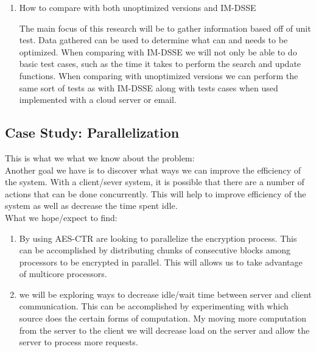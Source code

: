 \begin{enumerate}
\begin{itemize}
    \end{itemize}

  	\item How to compare with both unoptimized versions and IM-DSSE

	The main focus of this research will be to gather information based off of unit test.
    Data gathered can be used to determine what can and needs to be optimized.
    When comparing with IM-DSSE we will not only be able to do basic test cases, such as the time it takes to perform the search and update functions.
    When comparing with unoptimized versions we can perform the same sort of tests as with IM-DSSE along with tests cases when used implemented with a cloud server or email. 
\end{enumerate}



\subsection {Case Study: Parallelization}
\label{subsec:parallel}



This is what we what we know about the problem: \\
Another goal we have is to discover what ways we can improve the efficiency of the system. With a client/sever system, it is possible that there are a number of actions that can be done concurrently. This will help to improve efficiency of the system as well as decrease the time spent idle. \\

What we hope/expect to find:
\begin{enumerate}
\item By using AES-CTR are looking to parallelize the encryption process. This can be accomplished by distributing chunks of consecutive blocks among processors to be encrypted in parallel. This will allows us to take advantage of multi\-core processors.
\item we will be exploring ways to decrease idle/wait time between server and client communication. This can be accomplished by experimenting with which source does the certain forms of computation. My moving more computation from the server to the client we will decrease load on the server and allow the server to process more requests. 
\end{enumerate}

